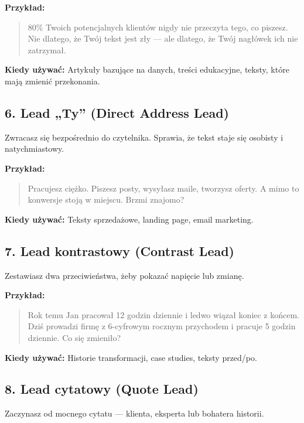 \documentclass[
  12pt,
  a4paper,
  twoside,
  openright,
  12pt,
  DIV=12,
  BCOR=12mm]{scrbook}
\begin{document}
\textbf{Przykład:}

\begin{quote}
80\% Twoich potencjalnych klientów nigdy nie przeczyta tego, co piszesz.
Nie dlatego, że Twój tekst jest zły --- ale dlatego, że Twój nagłówek
ich nie zatrzymał.
\end{quote}

\textbf{Kiedy używać:} Artykuły bazujące na danych, treści edukacyjne,
teksty, które mają zmienić przekonania.

\subsection{6. Lead „Ty'' (Direct Address
Lead)}\label{lead-ty-direct-address-lead}

Zwracasz się bezpośrednio do czytelnika. Sprawia, że tekst staje się
osobisty i natychmiastowy.

\textbf{Przykład:}

\begin{quote}
Pracujesz ciężko. Piszesz posty, wysyłasz maile, tworzysz oferty. A mimo
to konwersje stoją w miejscu. Brzmi znajomo?
\end{quote}

\textbf{Kiedy używać:} Teksty sprzedażowe, landing page, email
marketing.

\subsection{7. Lead kontrastowy (Contrast
Lead)}\label{lead-kontrastowy-contrast-lead}

Zestawiasz dwa przeciwieństwa, żeby pokazać napięcie lub zmianę.

\textbf{Przykład:}

\begin{quote}
Rok temu Jan pracował 12 godzin dziennie i ledwo wiązał koniec z końcem.
Dziś prowadzi firmę z 6-cyfrowym rocznym przychodem i pracuje 5 godzin
dziennie. Co się zmieniło?
\end{quote}

\textbf{Kiedy używać:} Historie transformacji, case studies, teksty
przed/po.

\subsection{8. Lead cytatowy (Quote
Lead)}\label{lead-cytatowy-quote-lead}

Zaczynasz od mocnego cytatu --- klienta, eksperta lub bohatera historii.
\end{document}
